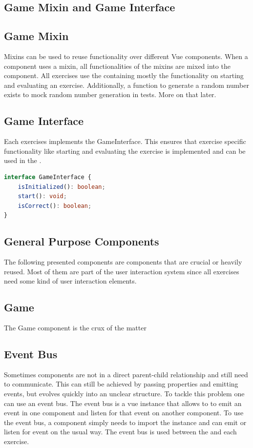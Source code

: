 \subsection{Game Mixin and Game Interface}

\subsection*{Game Mixin}
Mixins can be used to reuse functionality over different Vue components. When a component uses a mixin, all functionalities of the mixins are mixed into the component. All exercises use the  containing mostly the functionality on starting and evaluating an exercise. Additionally, a function to generate a random number exists to mock random number generation in tests. More on that later.

\subsection*{Game Interface}
Each exercises implements the GameInterface. This ensures that exercise specific functionality like starting and evaluating the exercise is implemented and can be used in the .

\begin{lstlisting}[language=TypeScript,caption={GameInterface},label={lst:gameInterface}]
interface GameInterface {
    isInitialized(): boolean;
    start(): void;
    isCorrect(): boolean;
}
\end{lstlisting}

\subsection{General Purpose Components}
\label{subsection:generalPuprposeComponents}
The following presented components are components that are crucial or heavily reused. Most of them are part of the user interaction system since all exercises need some kind of user interaction elements.

\subsection*{Game}
The Game component is the crux of the matter

\subsection{Event Bus}
Sometimes components are not in a direct parent-child relationship and still need to communicate. This can still be achieved by passing properties and emitting events, but evolves quickly into an unclear structure. To tackle this problem one can use an event bus. 
The event bus is a vue instance that allows to to emit an event in one component and listen for that event on another component. To use the event bus, a component simply needs to import the instance and can emit or listen for event on the usual way. The event bus is used between the  and each exercise.

